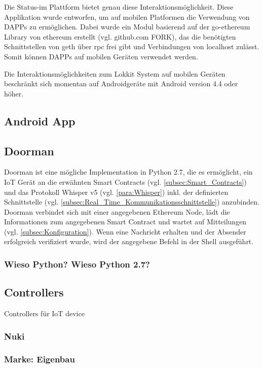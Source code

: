 Die Status-im Plattform bietet genau diese Interaktionsmöglichkeit. Diese Applikation wurde entworfen, um auf mobilen Platformen die Verwendung von \acrshort{DAPPs} zu ermöglichen. Dabei wurde ein Modul basierend auf der go-ethereum Library von ethereum erstellt (vgl. github.com FORK), das die benötigten Schnittstellen von geth über rpc frei gibt und Verbindungen von localhost zulässt. Somit können \acrshort{DAPPs} auf mobilen Geräten verwendet werden. \cite{status-im_whitepaper, github.com/status-im/status-go}


Die Interaktionsmöglichkeiten zum Lokkit System auf mobilen Geräten beschränkt sich momentan auf Androidgeräte mit Android version 4.4 oder höher.

\subsection{Android App}

\subsubsection{}


\subsection{Doorman}
\label{subsec:Doorman}
Doorman ist eine mögliche Implementation in Python 2.7, die es ermöglicht, ein IoT Gerät an die erwähnten Smart Contracts (vgl. \ref{subsec:Smart_Contracts}) und das Protokoll Whisper v5 (vgl. \ref{para:Whisper}) inkl. der definierten Schnittstelle (vgl. \ref{subsec:Real_Time_Kommunikationsschnittstelle}) anzubinden. Doorman verbindet sich mit einer angegebenen Ethereum Node, lädt die Informationen zum angegebenen Smart Contract und wartet auf Mitteilungen (vgl. \ref{subsec:Konfiguration}). Wenn eine Nachricht erhalten und der Absender erfolgreich verifiziert wurde, wird der angegebene Befehl in der Shell ausgeführt.

\subsubsection{Wieso Python? Wieso Python 2.7?}

\subsection{Controllers}
Controllers für IoT device
\subsubsection{Nuki}

\subsubsection{Marke: Eigenbau}
